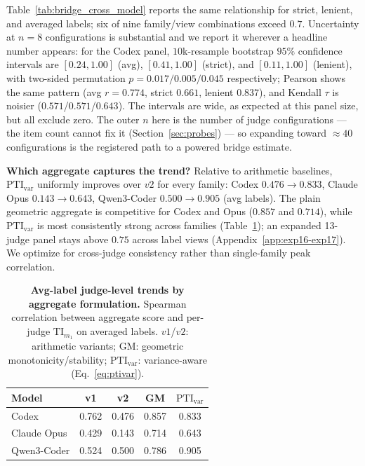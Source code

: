 \documentclass{article}
\newcommand{\TI}{\mathrm{TI}}                    %
\newcommand{\PTI}{\mathrm{PTI}}                  %
\newcommand{\TIm}[1]{\TI_{m_{#1}}}
\newcommand{\PTIvar}{\PTI_{\mathrm{var}}}        %
\begin{document}
Table~\ref{tab:bridge_cross_model} reports the same relationship for strict, lenient, and averaged labels; six of nine family/view combinations exceed $0.7$.
Uncertainty at $n{=}8$ configurations is substantial and we report it wherever a headline number appears: for the Codex panel, $10$k-resample bootstrap $95\%$ confidence intervals are $[0.24,1.00]$ (avg), $[0.41,1.00]$ (strict), and $[0.11,1.00]$ (lenient), with two-sided permutation $p=0.017/0.005/0.045$ respectively; Pearson shows the same pattern (avg $r=0.774$, strict $0.661$, lenient $0.837$), and Kendall $\tau$ is noisier ($0.571$/$0.571$/$0.643$).
The intervals are wide, as expected at this panel size, but all exclude zero.
The outer $n$ here is the number of judge configurations --- the item count cannot fix it (Section~\ref{sec:probes}) --- so expanding toward ${\approx}40$ configurations is the registered path to a powered bridge estimate.

\textbf{Which aggregate captures the trend?}
Relative to arithmetic baselines, $\PTIvar$ uniformly improves over $v2$ for every family: Codex $0.476 \rightarrow 0.833$, Claude Opus $0.143 \rightarrow 0.643$, Qwen3-Coder $0.500 \rightarrow 0.905$ (avg labels).
The plain geometric aggregate is competitive for Codex and Opus ($0.857$ and $0.714$), while $\PTIvar$ is most consistently strong across families (Table~\ref{tab:index_compare}); an expanded 13-judge panel stays above $0.75$ across label views (Appendix~\ref{app:exp16-exp17}).
We optimize for cross-judge consistency rather than single-family peak correlation.

\begin{table}[t]
  \centering
  \small
  \begin{tabular}{lcccc}
    \toprule
    \textbf{Model} & \textbf{v1} & \textbf{v2} & \textbf{GM} & $\PTIvar$ \\
    \midrule
    Codex       & 0.762 & 0.476 & 0.857 & 0.833 \\
    Claude Opus & 0.429 & 0.143 & 0.714 & 0.643 \\
    Qwen3-Coder & 0.524 & 0.500 & 0.786 & 0.905 \\
    \bottomrule
  \end{tabular}
  \caption{\textbf{Avg-label judge-level trends by aggregate formulation.} Spearman correlation between aggregate score and per-judge $\TIm{1}$ on averaged labels. $v1$/$v2$: arithmetic variants; GM: geometric monotonicity/stability; $\PTIvar$: variance-aware (Eq.~\ref{eq:ptivar}).}
  \label{tab:index_compare}
\end{table}
\end{document}
